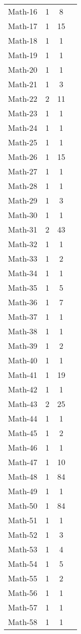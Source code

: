 \begin{footnotesize}
\begin{longtable}{lccc}
Math-16 & 1 & 8 & \\
Math-17 & 1 & 15 & \\
Math-18 & 1 & 1 & \\
Math-19 & 1 & 1 & \\
Math-20 & 1 & 1 & \\
Math-21 & 1 & 3 & \\
Math-22 & 2 & 11 & \\
Math-23 & 1 & 1 & \\
Math-24 & 1 & 1 & \\
Math-25 & 1 & 1 & \\
Math-26 & 1 & 15 & \\
Math-27 & 1 & 1 & \\
Math-28 & 1 & 1 & \\
Math-29 & 1 & 3 & \\
Math-30 & 1 & 1 & \\
Math-31 & 2 & 43 & \\
Math-32 & 1 & 1 & \\
Math-33 & 1 & 2 & \\
Math-34 & 1 & 1 & \\
Math-35 & 1 & 5 & \\
Math-36 & 1 & 7 & \\
Math-37 & 1 & 1 & \\
Math-38 & 1 & 1 & \\
Math-39 & 1 & 2 & \\
Math-40 & 1 & 1 & \\
Math-41 & 1 & 19 & \\
Math-42 & 1 & 1 & \\
Math-43 & 2 & 25 & \\
Math-44 & 1 & 1 & \\
Math-45 & 1 & 2 & \\
Math-46 & 1 & 1 & \\
Math-47 & 1 & 10 & \\
Math-48 & 1 & 84 & \\
Math-49 & 1 & 1 & \\
Math-50 & 1 & 84 & \\
Math-51 & 1 & 1 & \\
Math-52 & 1 & 3 & \\
Math-53 & 1 & 4 & \\
Math-54 & 1 & 5 & \\
Math-55 & 1 & 2 & \\
Math-56 & 1 & 1 & \\
Math-57 & 1 & 1 & \\
Math-58 & 1 & 1 & \\

\end{longtable}
\end{footnotesize}
